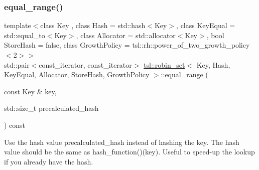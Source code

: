 \subsubsection{\texorpdfstring{equal\_range()}{equal\_range()}\hspace{0.1cm}{\footnotesize\ttfamily [2/6]}}
{\footnotesize\ttfamily template$<$class Key , class Hash  = std\+::hash$<$\+Key$>$, class Key\+Equal  = std\+::equal\+\_\+to$<$\+Key$>$, class Allocator  = std\+::allocator$<$\+Key$>$, bool Store\+Hash = false, class Growth\+Policy  = tsl\+::rh\+::power\+\_\+of\+\_\+two\+\_\+growth\+\_\+policy$<$2$>$$>$ \\
std\+::pair$<$const\+\_\+iterator, const\+\_\+iterator$>$ \mbox{\hyperlink{classtsl_1_1robin__set}{tsl\+::robin\+\_\+set}}$<$ Key, Hash, Key\+Equal, Allocator, Store\+Hash, Growth\+Policy $>$\+::equal\+\_\+range (\begin{DoxyParamCaption}\item[{const Key \&}]{key,  }\item[{std\+::size\+\_\+t}]{precalculated\+\_\+hash }\end{DoxyParamCaption}) const\hspace{0.3cm}{\ttfamily [inline]}}





Use the hash value \textquotesingle{}precalculated\+\_\+hash\textquotesingle{} instead of hashing the key. The hash value should be the same as hash\+\_\+function()(key). Useful to speed-\/up the lookup if you already have the hash. \mbox{\label{classtsl_1_1robin__set_aea679f6fa9dee2077410a462dce63b93}} 
